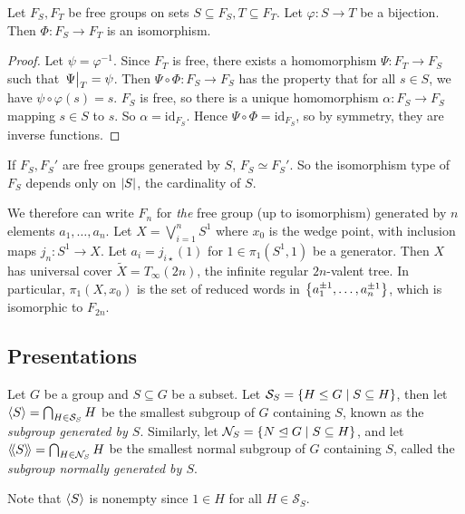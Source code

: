 \begin{lemma}
	Let \( F_S, F_T \) be free groups on sets \( S \subseteq F_S, T \subseteq F_T \).
	Let \( \varphi \colon S \to T \) be a bijection.
	Then \( \Phi \colon F_S \to F_T \) is an isomorphism.
\end{lemma}
\begin{proof}
	Let \( \psi = \varphi^{-1} \).
	Since \( F_T \) is free, there exists a homomorphism \( \Psi \colon F_T \to F_S \) such that \( \eval{\Psi}_T = \psi \).
	Then \( \Psi \circ \Phi \colon F_S \to F_S \) has the property that for all \( s \in S \), we have \( \psi \circ \varphi(s) = s \).
	\( F_S \) is free, so there is a unique homomorphism \( \alpha \colon F_S \to F_S \) mapping \( s \in S \) to \( s \).
	So \( \alpha = \mathrm{id}_{F_S} \).
	Hence \( \Psi \circ \Phi = \mathrm{id}_{F_S} \), so by symmetry, they are inverse functions.
\end{proof}
\begin{corollary}
	If \( F_S, F_S' \) are free groups generated by \( S \), \( F_S \simeq F_S' \).
	So the isomorphism type of \( F_S \) depends only on \( \abs{S} \), the cardinality of \( S \).
\end{corollary}
We therefore can write \( F_n \) for \emph{the} free group (up to isomorphism) generated by \( n \) elements \( a_1, \dots, a_n \).
Let \( X = \bigvee_{i=1}^n S^1 \) where \( x_0 \) is the wedge point, with inclusion maps \( j_n \colon S^1 \to X \).
Let \( a_i = j_{i\star}(1) \) for \( 1 \in \pi_1(S^1,1) \) be a generator.
Then \( X \) has universal cover \( \widetilde X = T_\infty(2n) \), the infinite regular \( 2n \)-valent tree.
In particular, \( \pi_1(X,x_0) \) is the set of reduced words in \( \qty{a_1^{\pm 1}, \dots, a_n^{\pm 1}} \), which is isomorphic to \( F_{2n} \).

\subsection{Presentations}
\begin{definition}
	Let \( G \) be a group and \( S \subseteq G \) be a subset.
	Let \( \mathcal S_S = \qty{H \leq G \mid S \subseteq H} \), then let \( \left\langle{} S \right\rangle = \bigcap_{H \in \mathcal S_S} H \) be the smallest subgroup of \( G \) containing \( S \), known as the \emph{subgroup generated by \( S \)}.
	Similarly, let \( \mathcal N_S = \qty{N \trianglelefteq G \mid S \subseteq H} \), and let \( \left\langle\!\left\langle{} S \right\rangle\!\right\rangle = \bigcap_{H \in \mathcal N_S} H \) be the smallest normal subgroup of \( G \) containing \( S \), called the \emph{subgroup normally generated by \( S \)}.
\end{definition}
Note that \( \left\langle{} S \right\rangle \) is nonempty since \( 1 \in H \) for all \( H \in \mathcal S_S \).

